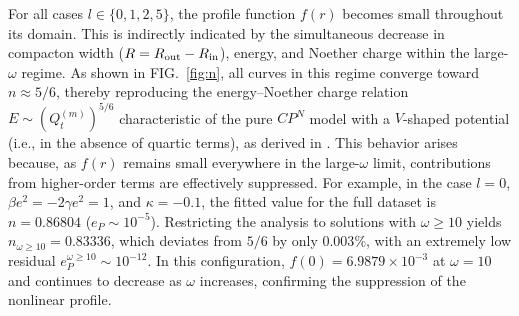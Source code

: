 \documentclass[aps,prd,superscriptaddress,notitlepage,11pt,final,longbibliography,nofootinbib]{revtex4-1}
\numberwithin{equation}{section}
\begin{document}
For all cases $l \in \{0, 1, 2, 5\}$, the profile function $f(r)$ becomes small throughout its domain. This is indirectly indicated by the simultaneous decrease in compacton width ($R = R_{\rm out} - R_{\rm in}$), energy, and Noether charge within the large-$\omega$ regime. As shown in FIG.~\ref{fig:n}, all curves in this regime converge toward $n \approx 5/6$, thereby reproducing the energy--Noether charge relation $E \sim (Q_t^{(m)})^{5/6}$ characteristic of the pure $CP^N$ model with a $V$-shaped potential (i.e., in the absence of quartic terms), as derived in \cite{Klimas:2017eft}. This behavior arises because, as $f(r)$ remains small everywhere in the large-$\omega$ limit, contributions from higher-order terms are effectively suppressed. For example, in the case $l=0$, $\beta e^2 = -2\gamma e^2 = 1$, and $\kappa = -0.1$, the fitted value for the full dataset is $n = 0.86804$ ($e_P \sim 10^{-5}$). Restricting the analysis to solutions with $\omega \geq 10$ yields $n_{\omega \geq 10} = 0.83336$, which deviates from $5/6$ by only $0.003\%$, with an extremely low residual $e_P^{\omega \geq 10} \sim 10^{-12}$. In this configuration, $f(0) = 6.9879 \times 10^{-3}$ at $\omega = 10$ and continues to decrease as $\omega$ increases, confirming the suppression of the nonlinear profile.
\end{document}
